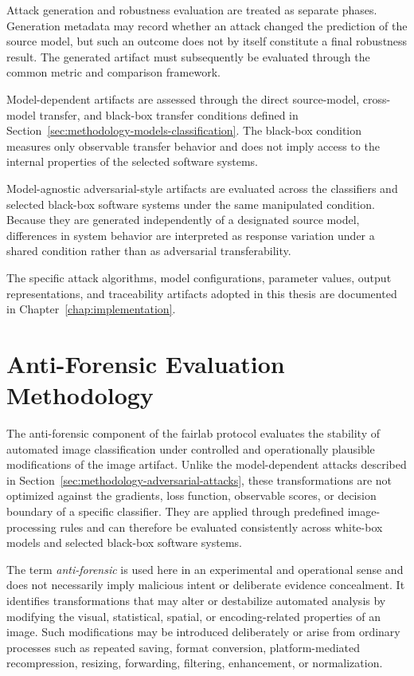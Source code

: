 Attack generation and robustness evaluation are treated as separate phases.
Generation metadata may record whether an attack changed the prediction of the
source model, but such an outcome does not by itself constitute a final
robustness result. The generated artifact must subsequently be evaluated
through the common metric and comparison framework.

Model-dependent artifacts are assessed through the direct source-model,
cross-model transfer, and black-box transfer conditions defined in
Section~\ref{sec:methodology-models-classification}. The black-box condition
measures only observable transfer behavior and does not imply access to the
internal properties of the selected software systems.

Model-agnostic adversarial-style artifacts are evaluated across the
classifiers and selected black-box software systems under the same manipulated
condition. Because they are generated independently of a designated source
model, differences in system behavior are interpreted as response variation
under a shared condition rather than as adversarial transferability.

The specific attack algorithms, model configurations, parameter values, output
representations, and traceability artifacts adopted in this thesis are
documented in Chapter~\ref{chap:implementation}.

\section{Anti-Forensic Evaluation Methodology}
\label{sec:methodology-anti-forensic-transformations}

The anti-forensic component of the \gls{fairlab} protocol evaluates the
stability of automated image classification under controlled and operationally
plausible modifications of the image artifact. Unlike the model-dependent
attacks described in
Section~\ref{sec:methodology-adversarial-attacks}, these transformations are
not optimized against the gradients, loss function, observable scores, or
decision boundary of a specific classifier. They are applied through
predefined image-processing rules and can therefore be evaluated consistently
across white-box models and selected black-box software systems.

The term \textit{anti-forensic} is used here in an experimental and operational
sense and does not necessarily imply malicious intent or deliberate evidence
concealment. It identifies transformations that may alter or destabilize
automated analysis by modifying the visual, statistical, spatial, or
encoding-related properties of an image. Such modifications may be introduced
deliberately or arise from ordinary processes such as repeated saving, format
conversion, platform-mediated recompression, resizing, forwarding, filtering,
enhancement, or normalization.

